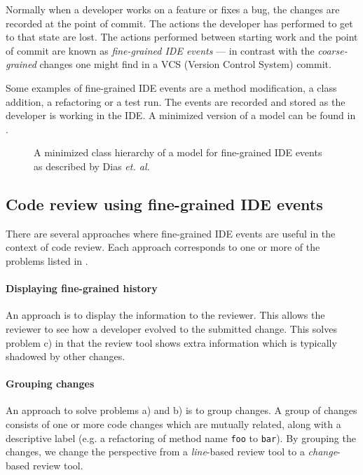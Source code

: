 \documentclass[conference,a4paper]{IEEEtran}
\newcommand{\code}[1]{\texttt{#1}}
\begin{document}
Normally when a developer works on a feature or fixes a bug, the
changes are recorded at the point of commit. The actions the developer
has performed to get to that state are lost. The actions performed
between starting work and the point of commit are known as
\textit{fine-grained IDE events} --- in contrast with the
\textit{coarse-grained} changes one might find in a VCS (Version
Control System) commit.

Some examples of fine-grained IDE events are a method modification, a
class addition, a refactoring or a test run. The events are recorded
and stored as the developer is working in the IDE. A minimized version
of a model can be found in .
\begin{figure}[h]
  \centering
  \resizebox{!}{0.3\textheight}{%
    
  }
  \caption{A minimized class hierarchy of a model for fine-grained IDE
    events as described by Dias \textit{et. al.}\cite{Dias15a}}
  \label{fig:ide-event-class-model}
\end{figure}

\subsection{Code review using fine-grained IDE events}
\label{sec:code-review-using-1}

There are several approaches where fine-grained IDE events are useful
in the context of code review. Each approach corresponds to one or
more of the problems listed in .

\paragraph{Displaying fine-grained history}

An approach is to display the information to the reviewer. This allows
the reviewer to see how a developer evolved to the submitted
change. This solves problem c) in that the review tool shows extra
information which is typically shadowed by other changes.

\paragraph{Grouping changes}

An approach to solve problems a) and b) %
is to group changes. A group of changes consists of one or more code
changes which are mutually related, along with a descriptive label
(e.g. a refactoring of method name \code{foo} to \code{bar}). By
grouping the changes, we change the perspective from a
\textit{line}-based review tool to a \textit{change}-based review
tool.
\end{document}
